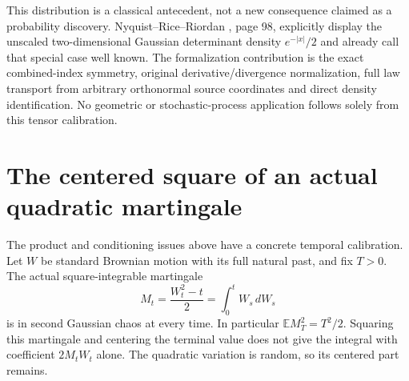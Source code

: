 \documentclass[11pt]{article}
\newcommand{\E}{\mathbb E}
\begin{document}
This distribution is a classical antecedent, not a new consequence
claimed as a probability discovery. Nyquist--Rice--Riordan
\cite{NRR}, page 98, explicitly display the unscaled two-dimensional
Gaussian determinant density $e^{-|x|}/2$ and already call that
special case well known. The formalization contribution is the
exact combined-index symmetry, original derivative/divergence
normalization, full law transport from arbitrary orthonormal source
coordinates and direct density identification. No geometric or
stochastic-process application follows solely from this tensor
calibration.

\section{The centered square of an actual quadratic martingale}\label{sec:martingalesquare}
The product and conditioning issues above have a concrete temporal
calibration. Let $W$ be standard Brownian motion with its full natural
past, and fix $T>0$. The actual square-integrable martingale
\[
 M_t=\frac{W_t^2-t}{2}=\int_0^tW_s\,dW_s
\]
is in second Gaussian chaos at every time. In particular
$\E M_T^2=T^2/2$. Squaring this martingale and centering the terminal
value does not give the integral with coefficient $2M_tW_t$ alone.
The quadratic variation is random, so its centered part remains.
\end{document}
